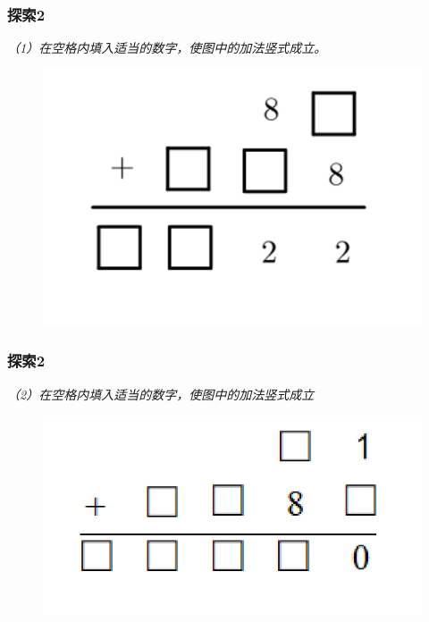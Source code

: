 \begin{frame}
    \frametitle{探索2}
    \textit{（1）在空格内填入适当的数字，使图中的加法竖式成立。}
    
    \begin{figure}[H] 
        \centering
        \includegraphics[width=1\textwidth]{./pics/Chapter_3/tansuo2_1.png}
    \end{figure}
\end{frame}

\begin{frame}
    \frametitle{探索2}
    \textit{（2）在空格内填入适当的数字，使图中的加法竖式成立}

    
    \begin{figure}[H] 
        \centering
        \includegraphics[width=1\textwidth]{./pics/Chapter_3/tansuo2_2.png}
    \end{figure}
\end{frame}

